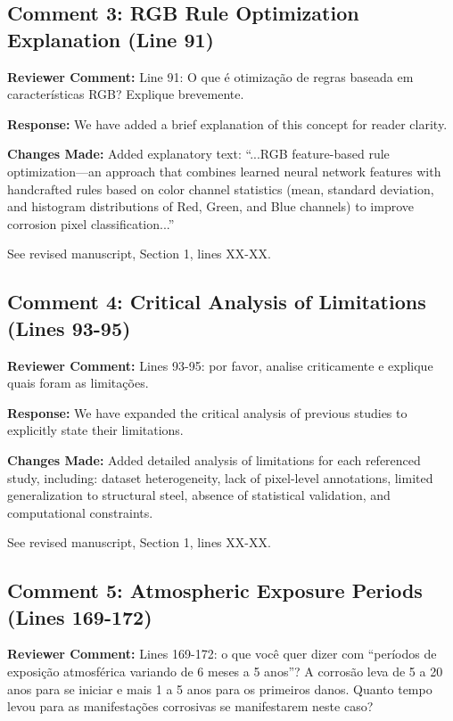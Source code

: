 \documentclass[11pt]{article}
\newcommand{\reviewercomment}[1]{\textcolor{reviewercolor}{\textbf{Reviewer Comment:} #1}}
\newcommand{\response}[1]{\textcolor{responsecolor}{\textbf{Response:} #1}}
\newcommand{\change}[1]{\textcolor{changecolor}{\textbf{Changes Made:} #1}}
\begin{document}
\subsection{Comment 3: RGB Rule Optimization Explanation (Line 91)}

\reviewercomment{Line 91: O que é otimização de regras baseada em características RGB? Explique brevemente.}

\response{We have added a brief explanation of this concept for reader clarity.}

\change{Added explanatory text: ``...RGB feature-based rule optimization—an approach that combines learned neural network features with handcrafted rules based on color channel statistics (mean, standard deviation, and histogram distributions of Red, Green, and Blue channels) to improve corrosion pixel classification...''

See revised manuscript, Section 1, lines XX-XX.}

\subsection{Comment 4: Critical Analysis of Limitations (Lines 93-95)}

\reviewercomment{Lines 93-95: por favor, analise criticamente e explique quais foram as limitações.}

\response{We have expanded the critical analysis of previous studies to explicitly state their limitations.}

\change{Added detailed analysis of limitations for each referenced study, including: dataset heterogeneity, lack of pixel-level annotations, limited generalization to structural steel, absence of statistical validation, and computational constraints.

See revised manuscript, Section 1, lines XX-XX.}

\subsection{Comment 5: Atmospheric Exposure Periods (Lines 169-172)}

\reviewercomment{Lines 169-172: o que você quer dizer com ``períodos de exposição atmosférica variando de 6 meses a 5 anos''? A corrosão leva de 5 a 20 anos para se iniciar e mais 1 a 5 anos para os primeiros danos. Quanto tempo levou para as manifestações corrosivas se manifestarem neste caso?}
\end{document}
